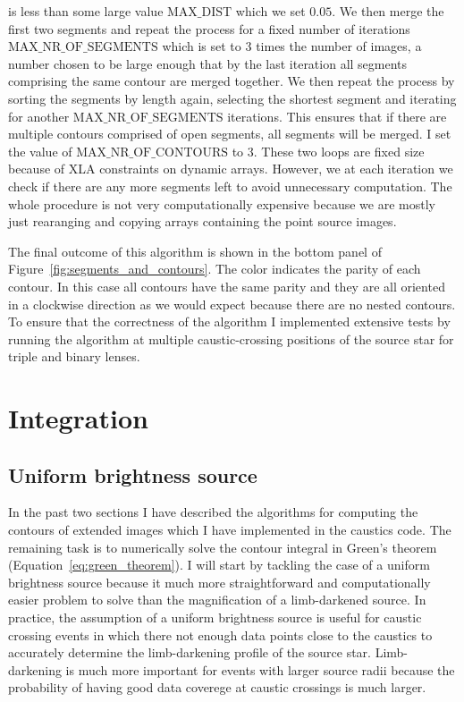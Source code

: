 \documentclass[12pt,dvipsnames]{report}
\newcommand{\ssf}[1]{\textsf{#1}}
\begin{document}
is less than some large value $\text{MAX\_DIST}$ which we set $0.05$. 
We then merge the first two segments and repeat the process for a fixed number of iterations 
$\text{MAX\_NR\_OF\_SEGMENTS}$ which is set to 3 times the number of images, a number 
chosen to be large enough that by the last iteration all segments comprising the same contour 
are merged together. 
We then repeat the process by sorting the segments by length again, selecting the shortest 
segment and iterating for another $\text{MAX\_NR\_OF\_SEGMENTS}$ iterations. This ensures that
if there are multiple contours comprised of open segments, all segments will be merged. 
I set the value of $\text{MAX\_NR\_OF\_CONTOURS}$ to 3.
These two loops are fixed size because of  \ssf{XLA} constraints on dynamic arrays. However, 
we at each iteration we check if there are 
any more segments left to avoid unnecessary computation. The whole procedure is not very 
computationally expensive because we are mostly just rearanging and copying arrays containing
the point source images.

The final outcome of this algorithm is shown in the bottom panel of 
Figure~\ref{fig:segments_and_contours}. The color indicates the parity of each contour. In this 
case all contours have the same parity and they are all oriented in a clockwise direction
as we would expect because there are no nested contours. To ensure that the correctness of 
the algorithm I implemented extensive tests by running the algorithm at multiple caustic-crossing 
positions of the source star for triple and binary lenses. 

\section{Integration}
\label{sec:integration}
\subsection{Uniform brightness source}
\label{ssec:mag_uniform}
In the past two sections I have described the algorithms for computing the contours of extended
images which I have implemented in the \ssf{caustics} code. The remaining task is to numerically 
solve the contour integral in Green's theorem (Equation~\ref{eq:green_theorem}). I will start by 
tackling the case of a uniform brightness source because it much more straightforward and 
computationally easier problem to solve than the magnification of a limb-darkened source. In
practice, the assumption of a uniform brightness source is useful for caustic crossing 
events in which there not enough data points close to the caustics to accurately determine 
the limb-darkening profile of the source star. Limb-darkening is much more important for 
events with larger source radii because the probability of having good data coverege at caustic
crossings is much larger. 
\end{document}
